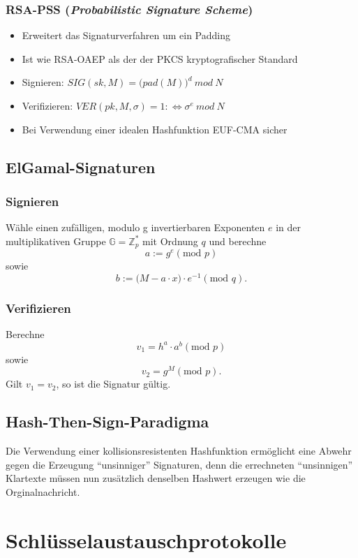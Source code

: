 \subsubsection{RSA-PSS (\textit{Probabilistic Signature Scheme})}
\begin{itemize}
	\item Erweitert das Signaturverfahren um ein Padding
	\item Ist wie RSA-OAEP als der der PKCS kryptografischer Standard
	\item Signieren: \(SIG(sk,M) = \big(pad(M)\big)^d~mod~N\)
	\item Verifizieren: \(VER(pk,M,\sigma)=1 :\Leftrightarrow \sigma^e~mod~N\)
	\item Bei Verwendung einer idealen Hashfunktion EUF-CMA sicher
\end{itemize}


\subsection{ElGamal-Signaturen}

\subsubsection{Signieren}
Wähle einen zufälligen, modulo g invertierbaren Exponenten \(e\) in der multiplikativen Gruppe \(\mathbb{G}=\mathbb{Z}_{p}^*\) mit Ordnung \(q\) und berechne
\[a := g^e (\text{mod } p)\]
sowie
\[b := \big(M - a \cdot x \big) \cdot e^{-1}(\text{mod } q).\]

\subsubsection{Verifizieren}
Berechne
\[v_1 = h^a \cdot a^b (\text{mod } p)\]
sowie
\[v_2 = g^M (\text{mod } p).\]
Gilt \(v_1=v_2\), so ist die Signatur gültig.


\subsection{Hash-Then-Sign-Paradigma}
Die Verwendung einer kollisionsresistenten Hashfunktion ermöglicht eine Abwehr gegen die Erzeugung "`unsinniger"' Signaturen, denn die errechneten "`unsinnigen"' Klartexte müssen nun zusätzlich denselben Hashwert erzeugen wie die Orginalnachricht.



\section{Schlüsselaustauschprotokolle}

